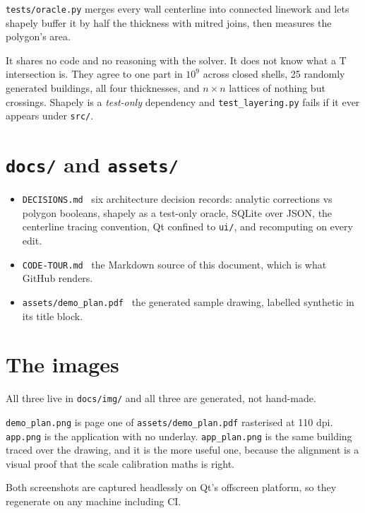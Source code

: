 \documentclass[11pt,letterpaper]{article}
\newcommand{\code}[1]{\texttt{\small #1}}
\begin{document}
\code{tests/oracle.py} merges every wall centerline into connected linework
and lets shapely buffer it by half the thickness with mitred joins, then
measures the polygon's area.

\begin{keypoint}
It shares no code and no reasoning with the solver. It does not know what a
T intersection is. They agree to one part in $10^9$ across closed shells, 25
randomly generated buildings, all four thicknesses, and $n \times n$
lattices of nothing but crossings. Shapely is a \emph{test-only} dependency
and \code{test\_layering.py} fails if it ever appears under \code{src/}.
\end{keypoint}

\section{\texttt{docs/} and \texttt{assets/}}

\begin{itemize}
  \item \code{DECISIONS.md} \textendash\ six architecture decision records:
    analytic corrections vs polygon booleans, shapely as a test-only oracle,
    SQLite over JSON, the centerline tracing convention, Qt confined to
    \code{ui/}, and recomputing on every edit.
  \item \code{CODE-TOUR.md} \textendash\ the Markdown source of this
    document, which is what GitHub renders.
  \item \code{assets/demo\_plan.pdf} \textendash\ the generated sample
    drawing, labelled synthetic in its title block.
\end{itemize}

\section{The images}

All three live in \code{docs/img/} and all three are generated, not
hand-made.

\code{demo\_plan.png} is page one of \code{assets/demo\_plan.pdf} rasterised
at 110 dpi. \code{app.png} is the application with no underlay.
\code{app\_plan.png} is the same building traced over the drawing, and it is
the more useful one, because the alignment is a visual proof that the scale
calibration maths is right.

Both screenshots are captured headlessly on Qt's offscreen platform, so they
regenerate on any machine including CI.
\end{document}

